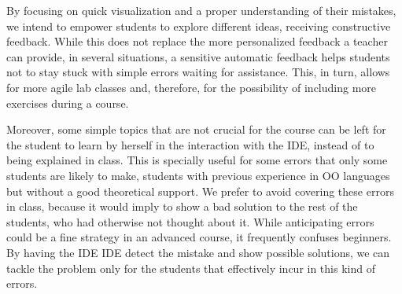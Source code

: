 By focusing on quick visualization and a proper understanding of their mistakes,
we intend to empower students to explore different ideas, receiving constructive feedback.
While this does not replace the more personalized feedback a teacher can provide, 
in several situations, a sensitive automatic feedback helps students not to stay stuck with simple errors 
waiting for assistance.
This, in turn, allows for more agile lab classes and, therefore, 
for the possibility of including more exercises during a course.

Moreover, some simple topics that are not crucial for the course
can be left for the student to learn by herself in the interaction with the IDE, 
instead of to being explained in class.
This is specially useful for some errors that only some students are likely to make,
\eg students with previous experience in OO languages but without a good theoretical support.
We prefer to avoid covering these errors in class, 
because it would imply to show a bad solution to the rest of the students, 
who had otherwise not thought about it. 
While anticipating errors could be a fine strategy in an advanced course, it frequently confuses beginners.
By having the IDE IDE detect the mistake and show possible solutions,
we can tackle the problem only for the students that effectively incur in this kind of errors.

